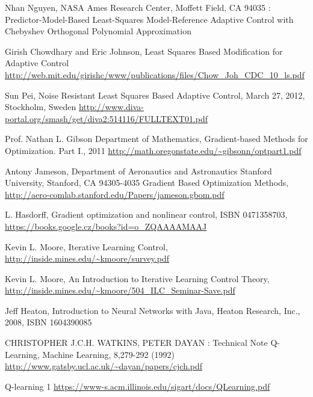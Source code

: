 \begin{thebibliography}{99}                                \label{literatura}

 Nhan Nguyen, NASA Ames Research Center, Moffett Field, CA 94035 :
Predictor-Model-Based Least-Squares Model-Reference Adaptive Control with Chebyshev Orthogonal Polynomial Approximation

 Girish Chowdhary and Eric Johnson, Least  Squares  Based  Modification  for  Adaptive  Control
\url{http://web.mit.edu/girishc/www/publications/files/Chow_Joh_CDC_10_ls.pdf}

Sun Pei, Noise Resistant Least Squares Based Adaptive Control, March 27, 2012, Stockholm, Sweden
\url{http://www.diva-portal.org/smash/get/diva2:514116/FULLTEXT01.pdf}


 Prof. Nathan L. Gibson Department of Mathematics,
Gradient-based Methods for Optimization. Part I., 2011
\url{http://math.oregonstate.edu/~gibsonn/optpart1.pdf}

 Antony Jameson,
Department of Aeronautics and Astronautics
Stanford University, Stanford, CA 94305-4035
Gradient Based Optimization Methods,
\url{http://aero-comlab.stanford.edu/Papers/jameson.gbom.pdf}

 L. Hasdorff, Gradient optimization and nonlinear control,
ISBN	0471358703, \url{https://books.google.cz/books?id=o\_ZQAAAAMAAJ}

 Kevin L. Moore, Iterative Learning Control,
\url{http://inside.mines.edu/~kmoore/survey.pdf}

  Kevin L. Moore, An Introduction to Iterative Learning Control Theory,
\url{http://inside.mines.edu/~kmoore/504_ILC_Seminar-Save.pdf}

 Jeff Heaton, Introduction to Neural Networks with Java,
Heaton Research, Inc., 2008, ISBN	1604390085


CHRISTOPHER  J.C.H. WATKINS, PETER DAYAN : Technical Note Q-Learning,
Machine Learning,  8,279-292 (1992)
\url{http://www.gatsby.ucl.ac.uk/~dayan/papers/cjch.pdf}

 Q-learning 1
\url{https://www-s.acm.illinois.edu/sigart/docs/QLearning.pdf}


\end{thebibliography}
